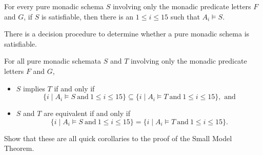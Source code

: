 \begin{corollary}
For every pure monadic schema $S$ involving only the monadic predicate letters $F$ and $G$, if $S$ is satisfiable, then there is an $1\leq i\leq 15$ such that $A_i\models S$. 
\end{corollary}
\fi
\begin{corollary}
There is a decision procedure to determine whether a pure
monadic schema is satisfiable.
\end{corollary}


\begin{corollary}\label{monad-cor}
For all pure monadic schemata $S$ and $T$ involving only the monadic predicate letters $F$ and $G$,
\begin{itemize}
\item[]\label{imp-item}
$S$ implies  $T$  if and only if 
\[\{i\mid A_i\models S\ \mbox{and}\ 1\leq i\leq 15\}\subseteq\{i\mid A_i\models T\ \mbox{and}\ 1\leq i\leq 15\},\mbox{ and}\]
\item[]\label{equiv-item}
$S$ and $T$ are equivalent if and only if 
\[\{i\mid A_i\models S\ \mbox{and}\ 1\leq i\leq 15\}=\{i\mid A_i\models T\ \mbox{and}\ 1\leq i\leq 15\}.\]
\end{itemize}

\begin{aside}
    Show that these are all quick corollaries to the proof of the Small Model Theorem. 
\end{aside}
\end{corollary}

